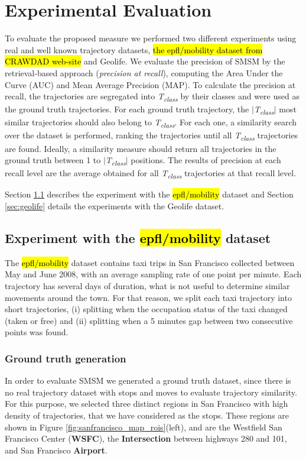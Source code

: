 \documentclass[12pt]{article}
\begin{document}
\section{Experimental Evaluation} \label{sec:experiments}
To evaluate the proposed measure we performed two different experiments using real and well known trajectory datasets, \hl{the epfl/mobility dataset from CRAWDAD web-site}\cite{epfl-mobility-20090224} and Geolife\cite{zheng2009mining}. We evaluate the precision of SMSM by the retrieval-based approach (\textit{precision at recall}), computing the Area Under the Curve (AUC) and Mean Average Precision (MAP). To calculate the precision at recall, the trajectories are segregated into \textit{T\textsubscript{class}} by their classes and were used as the ground truth trajectories. For each ground truth trajectory, the $|$\textit{T\textsubscript{class}}$|$ most similar trajectories should also belong to \textit{T\textsubscript{class}}. For each one, a similarity search over the dataset is performed, ranking the trajectories until all \textit{T\textsubscript{class}} trajectories are found. Ideally, a similarity measure should return all trajectories in the ground truth between 1 to $|$\textit{T\textsubscript{class}}$|$ positions. The results of precision at each recall level are the average obtained for all \textit{T\textsubscript{class}} trajectories at that recall level.

Section \ref{sec:crawdad} describes the experiment with the \hl{epfl/mobility} dataset and Section \ref{sec:geolife} details the experiments with the Geolife dataset.

\subsection{Experiment with the \hl{epfl/mobility} dataset}\label{sec:crawdad}

The \hl{epfl/mobility} dataset contains taxi trips in San Francisco collected between May and June 2008, with an average sampling rate of one point per minute. Each trajectory has several days of duration, what is not useful to determine similar movements around the town. For that reason, we split each taxi trajectory into short trajectories, (i) splitting when the occupation status of the taxi changed (taken or free) and (ii) splitting when a 5 minutes gap between two consecutive points was found.

\subsubsection{Ground truth generation}
In order to evaluate SMSM we generated a ground truth dataset, since there is no real trajectory dataset with stops and moves to evaluate trajectory similarity. For this purpose, we selected three distinct regions in San Francisco with high density of trajectories, that we have considered as the stops. These regions are shown in Figure \ref{fig:sanfrancisco_map_rois}(left), and are the Westfield San Francisco Center (\textbf{WSFC}), the \textbf{Intersection} between highways 280 and 101, and San Francisco \textbf{Airport}.
\end{document}
